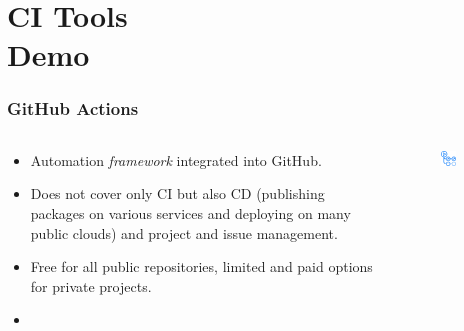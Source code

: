 \documentclass[aspectratio=169]{beamer}
\begin{document}

\section{CI Tools \\ \small Demo}

\begin{frame}
	\frametitle{GitHub Actions}
	
	\begin{columns}
\begin{column}{0.6\textwidth}
	\begin{block}{}
		\begin{itemize}
			\item Automation \emph{framework} integrated into GitHub.
			\item Does not cover only CI but also CD (publishing packages on various services and deploying on many public clouds) and project and issue management.
			\item Free for all public repositories, limited and paid options for private projects.
			\item {}
		\end{itemize}
	\end{block}
\end{column}
\begin{column}{0.4\textwidth}
	\begin{figure}[ht!]
	\begin{center}
  	  \includegraphics[width=0.5\textwidth]{img/gh-actions-logo.png}
	\end{center}
	\end{figure}
\end{column}
\end{columns}

\end{frame}
\end{document}
